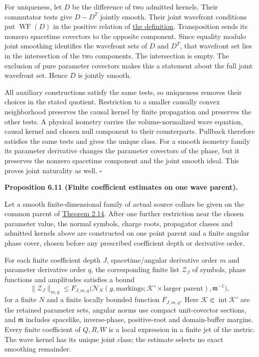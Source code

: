 \documentclass[
  english,
  11pt,
  reqno]{amsart}
\makeatletter
\newcommand{\pandocstatementheading}[1]{%
  \par\if@nobreak\else
    \addpenalty{\@beginparpenalty}%
    \addvspace{.5\baselineskip plus .2\baselineskip minus .2\baselineskip}%
  \fi
  {\normalfont\bfseries #1\par}%
  \nobreak\@afterindenttrue\@afterheading
}
\makeatother
\begin{document}
For uniqueness, let \(D\) be the difference of two admitted kernels.
Their commutator tests give \(D-D^T\) jointly smooth. Their joint
wavefront conditions put \(\operatorname{WF}(D)\) in the positive
relation of \hyperref[eq:online-wave-joint-positive-relation]{the
definition}. Transposition sends its nonzero spacetime covectors to the
opposite component. Since equality modulo joint smoothing identifies the
wavefront sets of \(D\) and \(D^T\), that wavefront set lies in the
intersection of the two components. The intersection is empty. The
exclusion of pure parameter covectors makes this a statement about the
full joint wavefront set. Hence \(D\) is jointly smooth.

All auxiliary constructions satisfy the same tests, so uniqueness
removes their choices in the stated quotient. Restriction to a smaller
causally convex neighborhood preserves the causal kernel by finite
propagation and preserves the other tests. A physical isometry carries
the volume-normalized wave equation, causal kernel and chosen null
component to their counterparts. Pullback therefore satisfies the same
tests and gives the unique class. For a smooth isometry family its
parameter derivative changes the parameter covectors of the phase, but
it preserves the nonzero spacetime component and the joint smooth ideal.
This proves joint naturality as well. \hfill\(\square\)

\pandocstatementheading{\leavevmode{}\label{prop:online-wave-kernel-finite-families}Proposition 6.11 (Finite coefficient estimates on one wave parent).}

Let a smooth finite-dimensional family of actual source collars be given
on the common parent of
\hyperref[thm:online-common-collar-finite-families]{Theorem 2.14}. After
one further restriction near the chosen parameter value, the normal
symbols, charge roots, propagator classes and admitted kernels above are
constructed on one point parent and a finite angular phase cover, chosen
before any prescribed coefficient depth or derivative order.

For each finite coefficient depth \(J\), spacetime/angular derivative
order \(m\) and parameter derivative order \(q\), the corresponding
finite list \(\mathcal Z_J\) of symbols, phase functions and amplitudes
satisfies a bound%
 \[
\|\mathcal Z_J\|_{m,q}
\le F_{J,m,q}\bigl(
\mathcal N_N(g,\text{markings};\mathcal K'\times\text{larger parent}),
\mathfrak m^{-1}\bigr),
\] for a finite \(N\) and a finite locally bounded function
\(F_{J,m,q}\). Here \(\mathcal K\Subset\operatorname{int}\mathcal K'\)
are the retained parameter sets, angular norms use compact unit-covector
sections, and \(\mathfrak m\) includes spacelike, inverse-phase,
positive-root and domain-buffer margins. Every finite coefficient of
\(Q,R,W\) is a local expression in a finite jet of the metric. The wave
kernel has its unique joint class; the estimate selects no exact
smoothing remainder.
\end{document}
